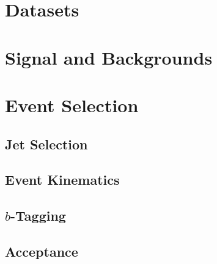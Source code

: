 \section{Datasets}
\label{sec:evt-datasets}

\section{Signal and Backgrounds}
\label{sec:evt-s+b}

\section{Event Selection}
\label{sec:evt-sel}

\subsection{Jet Selection}
\label{sec:evt-sel-jet}

\subsection{Event Kinematics}
\label{sec:evt-sel-event}

\subsection{$b$-Tagging}
\label{sec:evt-sel-btag}

\subsection{Acceptance}
\label{sec:evt-sel-acc}
